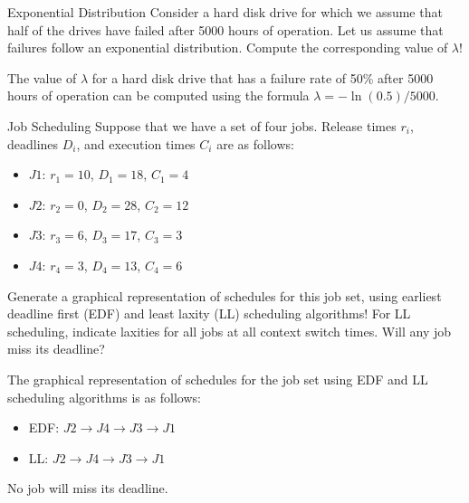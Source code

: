 \documentclass{article}
\begin{document}
\begin{exercise}{Exponential Distribution}
  Consider a hard disk drive for which we assume that half of the drives have failed after 5000 hours of operation. Let us assume that failures follow an exponential distribution. Compute the corresponding value of $\lambda$!

  \begin{solution}
    The value of $\lambda$ for a hard disk drive that has a failure rate of 50\% after 5000 hours of operation can be computed using the formula $\lambda = -\ln(0.5) / 5000$.
  \end{solution}
\end{exercise}

\begin{exercise}{Job Scheduling}
  Suppose that we have a set of four jobs. Release times $r_i$, deadlines $D_i$, and execution times $C_i$ are as follows:
  \begin{itemize}
    \item $J1$: $r_1=10$, $D_1=18$, $C_1=4$
    \item $J2$: $r_2=0$, $D_2=28$, $C_2=12$
    \item $J3$: $r_3=6$, $D_3=17$, $C_3=3$
    \item $J4$: $r_4=3$, $D_4=13$, $C_4=6$
  \end{itemize}
  Generate a graphical representation of schedules for this job set, using earliest deadline first (EDF) and least laxity (LL) scheduling algorithms! For LL scheduling, indicate laxities for all jobs at all context switch times. Will any job miss its deadline?

  \begin{solution}
    The graphical representation of schedules for the job set using EDF and LL scheduling algorithms is as follows:
    \begin{itemize}
      \item EDF: $J2 \rightarrow J4 \rightarrow J3 \rightarrow J1$
      \item LL: $J2 \rightarrow J4 \rightarrow J3 \rightarrow J1$
    \end{itemize}
    No job will miss its deadline.
  \end{solution}
\end{exercise}
\end{document}
